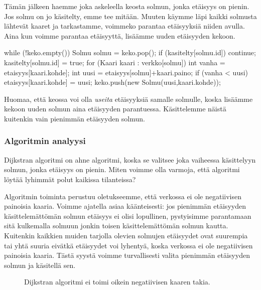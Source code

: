 Tämän jälkeen haemme joka askeleella keosta solmun,
jonka etäisyys on pienin.
Jos solmu on jo käsitelty, emme tee mitään.
Muuten käymme läpi kaikki solmusta lähtevät kaaret
ja tarkastamme, voimmeko parantaa etäisyyksiä
niiden avulla.
Aina kun voimme parantaa etäisyyttä,
lisäämme uuden etäisyyden kekoon.

\begin{code}
while (!keko.empty()) {
    Solmu solmu = keko.pop();
    if (kasitelty[solmu.id]) continue;
    kasitelty[solmu.id] = true;
    for (Kaari kaari : verkko[solmu]) {
        int vanha = etaisyys[kaari.kohde];
        int uusi = etaisyys[solmu]+kaari.paino;
        if (vanha < uusi) {
            etaisyys[kaari.kohde] = uusi;
            keko.push(new Solmu(uusi,kaari.kohde));
        }
    }
}
\end{code}

Huomaa, että keossa voi olla \emph{useita} etäisyyksiä
samalle solmulle, koska lisäämme kekoon uuden solmun
aina etäisyyden parantuessa.
Käsittelemme näistä kuitenkin vain pienimmän etäisyyden solmun.

\subsubsection{Algoritmin analyysi}

Dijkstran algoritmi on ahne algoritmi,
koska se valitsee joka vaiheessa käsitte\-lyyn solmun,
jonka etäisyys on pienin.
Miten voimme olla varmoja, että algoritmi löytää lyhimmät
polut kaikissa tilanteissa?

Algoritmin toiminta perustuu oletukseemme,
että verkossa ei ole negatiivisen painoisia kaaria.
Voimme ajatella asiaa käänteisesti: jos pienimmän etäisyyden
käsittelemättömän solmun
etäisyys ei olisi lopullinen, pystyisimme parantamaan
sitä kulkemalla solmuun jonkin toisen käsittelemättömän solmun kautta.
Kuitenkin kaikkien muiden tarjolla olevien solmujen etäisyy\-det
ovat suurempia tai yhtä suuria eivätkä etäisyydet voi lyhentyä,
koska verkossa ei ole negatiivisen painoisia kaaria.
Tästä syystä voimme turvallisesti valita pienimmän etäisyyden
solmun ja käsitellä sen.

\begin{figure}
\center
\begin{center}
\end{center}
\caption{Dijkstran algoritmi ei toimi oikein negatiivisen kaaren takia.}
\label{fig:dijneg}
\end{figure}

